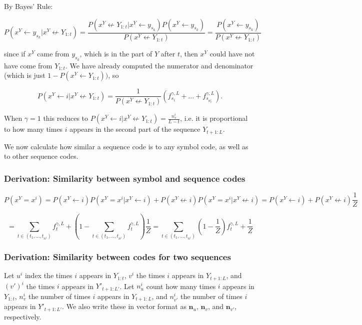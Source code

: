 \documentclass{article}
\begin{document}
By Bayes' Rule:

$$P(x^Y \leftarrow y_{s_k}| x^Y \not \leftarrow Y_{1:t}) = \frac{P(x^Y \not \leftarrow Y_{1:t}| x^Y \leftarrow y_{s_k})P(x^Y \leftarrow y_{s_k})}{P(x^Y \not\leftarrow Y_{1:t})} = \frac{P(x^Y \leftarrow y_{s_k})}{P(x^Y \not\leftarrow Y_{1:t})}$$

since if $x^Y$ came from $y_{s_k}$, which is in the part of $Y$ after $t$, then $x^Y$ could have not have come from $Y_{1:t}$. We have already computed the numerator and denominator (which is just $1 - P(x^Y \leftarrow Y_{1:t}))$, so

$$P(x^Y \leftarrow i|x^Y \not \leftarrow Y_{1:t}) = \frac{1}{P(x^Y \not\leftarrow Y_{1:t})}\left( f^{\gamma,L}_{s_1} + ... + f^{\gamma,L}_{s_{n^i_v}} \right).$$

When $\gamma = 1$ this reduces to $P(x^Y \leftarrow i|x^Y \not \leftarrow Y_{1:t}) = \frac{n^i_v}{L-t}$, i.e. it is proportional to how many times $i$ appears in the second part of the sequence $Y_{t+1:L}$.

We now calculate how similar a sequence code is to any symbol code, as well as to other sequence codes.

\subsubsection{Derivation: Similarity between symbol and sequence codes}

$$P(x^Y = x^i) = P(x^Y \leftarrow i)P(x^Y = x^i|x^Y \leftarrow i) + P(x^Y \not \leftarrow i)P(x^Y = x^i|x^Y \not \leftarrow i)
= P(x^Y \leftarrow i) + P(x^Y \not \leftarrow i)\frac{1}{Z}$$

$$= \sum\limits_{t \in (t_1, ..., t_{n^i})}f^{\gamma,L}_t + \left(1 - \sum\limits_{t \in (t_1, ..., t_{n^i})}f^{\gamma,L}_t\right)\frac{1}{Z}
= \sum\limits_{t \in (t_1, ..., t_{n^i})}\left(1 - \frac{1}{Z}\right)f^{\gamma,L}_t + \frac{1}{Z}$$

\subsubsection{Derivation: Similarity between codes for two sequences}

Let $u^i$ index the times $i$ appears in $Y_{1:t}$, $v^i$ the times $i$ appears in $Y_{t+1:L}$, and $(v')^i$ the times $i$ appears in $Y'_{t+1:L'}$. Let $n^i_u$ count how many times $i$ appears in $Y_{1:t}$, $n^i_v$ the number of times $i$ appears in $Y_{t+1:L}$, and $n^i_{v'}$ the number of times $i$ appears in $Y'_{t+1:L'}$. We also write these in vector format as $\mathbf{n}_u$, $\mathbf{n}_v$, and $\mathbf{n}_{v'}$, respectively.
\end{document}
